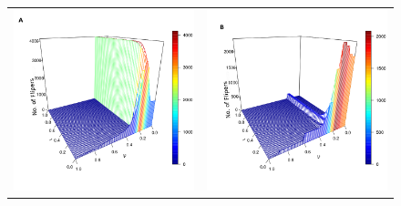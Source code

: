 \documentclass[11pt]{article}
\begin{document}
\begin{figure} [h!]
\begin{tabular}{cc}
\includegraphics[scale=0.28]{images/erdos_state_nus.png} & \includegraphics[scale=0.28]{images/watts_state_nus.png} \\

\end{tabular}
\end{figure}
\end{document}
